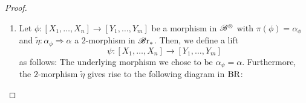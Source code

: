 \begin{proof}
\begin{enumerate}
        corresponding to the following diagrams:
        \begin{center}
        \end{center}


        The composition of two morphisms 
        \[
        g \colon [X_1, \dots, X_n] \to [X_1',
        \dots, X_n'], \; g' \colon [X_1', \dots, X_n'] \to [X_1'', \dots, X_n'']
        \]
        is being respected as the composition of the unique lifts $\bar{f}$ and
        $\bar{f}'$, lifts the diagram below and therefore have to be the unique lift for
        $g' \circ g$ and $f$:
        \begin{center}
        \end{center}
        \item Let $\phi \colon [X_1, \dots, X_n] \to [Y_1, \dots, Y_m]$ be a
        morphism in $\mathscr{B}^{\otimes}$ with $\pi(\phi)=\alpha_{\phi}$ and $\widetilde{\eta} \colon
        \alpha_{\phi} \Rightarrow \alpha$ a $2$-morphism in $\mathscr{B} \text{r}_{\ast}$. Then, we
        define a lift
        \[
            \psi \colon [X_1, \dots, X_n] \to [Y_1, \dots, Y_m]
        \]
        as follows: The underlying morphism we chose to be
        $\alpha_{\psi}=\alpha$. Furthermore, the $2$-morphism $\widetilde{\eta}$ gives rise
        to the following diagram in $\operatorname{BR}$:
        \begin{center}
\end{center}
\end{enumerate}
\end{proof}
